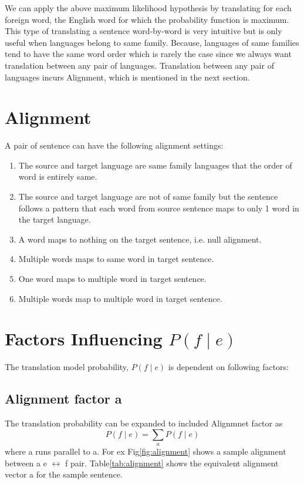 We can apply the above maximum likelihood hypothesis by translating for each foreign word, the English word for which the probability function is maximum. This type of translating a sentence word-by-word is very intuitive but is only useful when languages belong to same family. Because, languages of same families tend to have the same word order which is rarely the case since we always want translation between any pair of languages. Translation between any pair of languages incurs Alignment, which is mentioned in the next section.

\section{Alignment}
A pair of sentence can have the following alignment settings\cite{bhattacharyya}:\\
\begin{enumerate}
\item The source and target language are same family languages that the order of word is entirely same. 
\item The source and target language are not of same family but the sentence follows a pattern that each word from source sentence maps to only 1 word in the target language.
\item A word maps to nothing on the target sentence, i.e. null alignment.
\item Multiple words maps to same word in target sentence.
\item One word maps to multiple word in target sentence.
\item Multiple words map to multiple word in target sentence.
\end{enumerate}

\section{Factors Influencing $P(f\mid e)$}
The translation model probability, $P(f \mid e)$ is dependent on following factors:

\subsection{Alignment factor a}	
The translation probability can be expanded to included Alignmnet factor as
\begin{equation}
P(f\mid e) = \sum_{a}P(f\mid e)
\end{equation}
where a runs parallel to a. For ex Fig\ref{fig:alignment}\cite{bhattacharyya} shows a sample alignment between a e $\leftrightarrow$ f pair. Table\ref{tab:alignment} shows the equivalent alignment vector a for the sample sentence.

